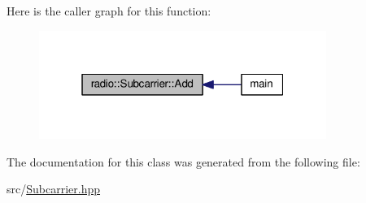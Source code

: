 Here is the caller graph for this function\+:
\nopagebreak
\begin{figure}[H]
\begin{center}
\leavevmode
\includegraphics[width=265pt]{classradio_1_1Subcarrier_adb2f047eac0a1cb07bc2d5ff1312ddf2_icgraph}
\end{center}
\end{figure}




The documentation for this class was generated from the following file\+:\begin{DoxyCompactItemize}
\item 
src/\hyperlink{Subcarrier_8hpp}{Subcarrier.\+hpp}\end{DoxyCompactItemize}
